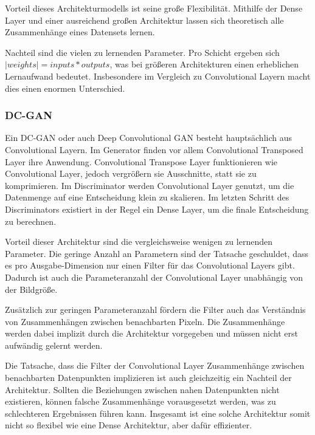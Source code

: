 Vorteil dieses Architekturmodells ist seine große Flexibilität.
Mithilfe der Dense Layer und einer ausreichend großen Architektur lassen sich theoretisch alle Zusammenhänge eines Datensets lernen.
\newline

Nachteil sind die vielen zu lernenden Parameter.
Pro Schicht ergeben sich $|weights| = inputs * outputs$, was bei größeren Architekturen einen erheblichen Lernaufwand bedeutet.
Insbesondere im Vergleich zu Convolutional Layern macht dies einen enormen Unterschied.

\subsubsection{DC-GAN}
Ein DC-GAN oder auch Deep Convolutional GAN besteht hauptsächlich aus Convolutional Layern.
Im Generator finden vor allem Convolutional Transposed Layer ihre Anwendung.
Convolutional Transpose Layer funktionieren wie Convolutional Layer, jedoch vergrößern sie Ausschnitte, statt sie zu komprimieren.
Im Discriminator werden Convolutional Layer genutzt, um die Datenmenge auf eine Entscheidung klein zu skalieren.
Im letzten Schritt des Discriminators existiert in der Regel ein Dense Layer, um die finale Entscheidung zu berechnen.
\newline

Vorteil dieser Architektur sind die vergleichsweise wenigen zu lernenden Parameter.
Die geringe Anzahl an Parametern sind der Tatsache geschuldet, dass es pro Ausgabe-Dimension nur einen Filter für das Convolutional Layers gibt.
Dadurch ist auch die Parameteranzahl der Convolutional Layer unabhängig von der Bildgröße.

Zusätzlich zur geringen Parameteranzahl fördern die Filter auch das Verständnis von Zusammenhängen zwischen benachbarten Pixeln.
Die Zusammenhänge werden dabei implizit durch die Architektur vorgegeben und müssen nicht erst aufwändig gelernt werden.
\newline

Die Tatsache, dass die Filter der Convolutional Layer Zusammenhänge zwischen benachbarten Datenpunkten implizieren ist auch gleichzeitig ein Nachteil der Architektur.
Sollten die Beziehungen zwischen nahen Datenpunkten nicht existieren, können falsche Zusammenhänge vorausgesetzt werden, was zu schlechteren Ergebnissen führen kann.
Insgesamt ist eine solche Architektur somit nicht so flexibel wie eine Dense Architektur, aber dafür effizienter.

